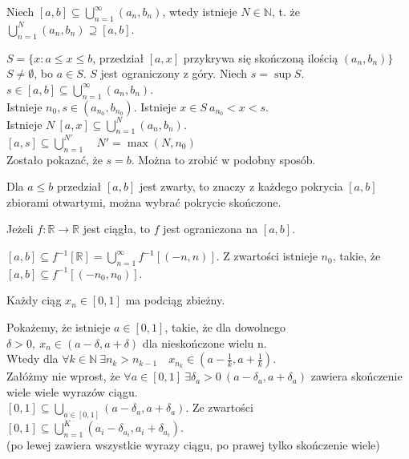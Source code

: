 \begin{lem}
    Niech $[a,b] \subseteq \bigcup\limits_{n=1}^\infty (a_n,b_n)$, wtedy istnieje $N \in \mathbb{N}$, t. że $\bigcup\limits_{n=1}^N (a_n,b_n) \supseteq [a,b]$.
    \begin{dd}
        $S = \{ x: a \le x \le b$, przedział $[a,x]$ przykrywa się skończoną ilością $(a_n,b_n)\}$ \\
        $S \neq \emptyset$, bo $a \in S$. $S$ jest ograniczony z góry. Niech $s = \sup S$. \\
        $ s \in [a,b] \subseteq \bigcup\limits_{n=1}^\infty (a_n,b_n)$. \\
        Istnieje $n_0, s \in (a_{n_0},b_{n_0})$. Istnieje $x \in S \ a_{n_0} < x < s $. \\
        Istnieje $N \ [a,x] \subseteq \bigcup\limits_{n=1}^N (a_n,b_n).$ \\
        $[a,s] \subseteq \bigcup\limits_{n=1}^{N'} \quad N' = \max(N,n_0)$ \\
        Zostało pokazać, że $s = b$. Można to zrobić w podobny sposób.
    \end{dd}
\end{lem}

\begin{wn}
    Dla $a \le b$ przedział $[a,b]$ jest zwarty, to znaczy z każdego pokrycia $[a,b]$ zbiorami otwartymi, 
    można wybrać pokrycie skończone.
\end{wn}

\begin{wn}
    Jeżeli $f: \mathbb{R} \rightarrow \mathbb{R}$ jest ciągła, to $f$ jest ograniczona na $[a,b]$.
\end{wn}
\begin{dd} 
    $[a,b] \subseteq f^{-1}[\mathbb{R}]  = \bigcup\limits_{n=1}^\infty f^{-1}[(-n,n)]$. 
    Z zwartości istnieje $n_0$, takie, że $[a,b] \subseteq f^{-1}[(-n_0,n_0)]$.
\end{dd} 

\begin{tw} 
    Każdy ciąg $x_n \in [0,1]$ ma podciąg zbieżny. 
\end{tw} 
\begin{dd} 
    Pokażemy, że istnieje $a \in [0,1]$, takie, że dla dowolnego 
    $\delta > 0, \ x_n \in (a-\delta,a+\delta)$ dla nieskończone wielu n. \\
    Wtedy dla $\forall k \in \mathbb{N} \ \exists n_k > n_{k-1} \quad x_{n_k} \in (a-\frac{1}{k},a+\frac{1}{k}).$ \\ 
    Załóżmy nie wprost, że $\forall a \in [0,1] \ \exists \delta_a > 0 \ (a-\delta_a,a+\delta_a)$ 
    zawiera skończenie wiele wiele wyrazów ciągu. \\
    $[0,1] \subseteq \bigcup\limits_{a \in [0,1]} (a-\delta_a,a+\delta_a) $. 
    Ze zwartości $[0,1] \subseteq \bigcup\limits_{n=1}^K (a_i-\delta_{a_i},a_i+\delta_{a_i}) $. \lightning \\ 
    (po lewej zawiera wszystkie wyrazy ciągu, po prawej tylko skończenie wiele)
\end{dd}

